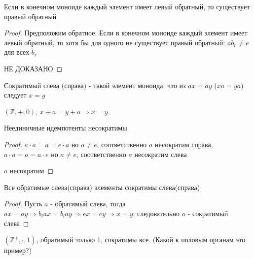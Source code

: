 \documentclass[../main/document.tex]{subfiles}
\begin{document}
\begin{thm}
Если в конечном моноиде каждый элемент имеет левый обратный, то существует правый обратный
\begin{proof}
Предположим обратное: Если в конечном моноиде каждый элемент имеет левый обратный, то хотя бы для одного не существует правый обратный: $ab_r\neq e$ для всех $b_r$

НЕ ДОКАЗАНО
\end{proof}
\end{thm}

\begin{dfn}
Сократимый слева (справа) - такой элемент моноида, что из $ax=ay$ ($xa=ya$) следует $x=y$ 
\end{dfn}
\begin{exm}
$(\mathbb{Z},+,0)$, $x+a=y+a\Rightarrow x=y$
\end{exm}
\begin{thm}
Неединичные идемпотенты несократимы
\begin{proof}
$a\cdot a=a=e\cdot a$ но $a\neq e$, соответственно $a$ несократим справа,
$a\cdot a=a=a\cdot e$ но $a\neq e$, соответственно $a$ несократим слева

$a$ несократим
\end{proof}
\end{thm}
\begin{thm}
Все обратимые слева(справа) элементы сократимы слева(справа)
\begin{proof}
Пусть $a$ - обратимый слева, тогда
$ax=ay\Rightarrow b_lax=b_lay\Rightarrow ex=ey\Rightarrow x=y$, следовательно $a$ - сократимый слева
\end{proof}
\end{thm}
\begin{exm}
$(\mathbb{Z}^+,\cdot,1)$, обратимый только 1, сократимы все. (Какой к половым органам это пример?)
\end{exm}
\end{document}
